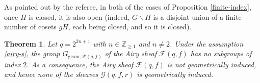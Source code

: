 \documentclass[11pt]{amsart}
\theoremstyle{plain}
\newtheorem{thm}{Theorem}
\newtheorem{lem}[thm]{Lemma}
\theoremstyle{definition}
\numberwithin{thm}{section}
\numberwithin{equation}{thm}
\newcommand{\GL}{\mathrm{GL}}
\newcommand{\sF}{{\mathcal F}}
\newcommand{\sG}{{\mathcal G}}
\newcommand{\Z}{{\mathbb Z}}
\newcommand{\0}{\emptyset}
\newcommand{\geo}{{\mathrm {geom}}}
\begin{document}
As pointed out by the referee, in both of the cases of Proposition \ref{finite-index}, once $H$ is closed, it is also open 
(indeed, $G \smallsetminus H$ is a disjoint union of a finite number of cosets $gH$, each being closed, and so it is closed).



%
%
%


\begin{thm}\label{prim}
Let $q = 2^{2n+1}$ with $n \in \Z_{\geq 1}$ and $n \neq 2$. Under the assumption \eqref{airy-s}, the group $G_{\geo,\sF(q,f)}$ of the Airy sheaf $\sF(q,f)$ has no subgroups of index $2$. As a consequence, the Airy sheaf $\sF(q,f)$ is not geometrically induced, and hence 
none of the sheaves $\sG(q,f,r)$ is geometrically induced.
\end{thm}
\end{document}
